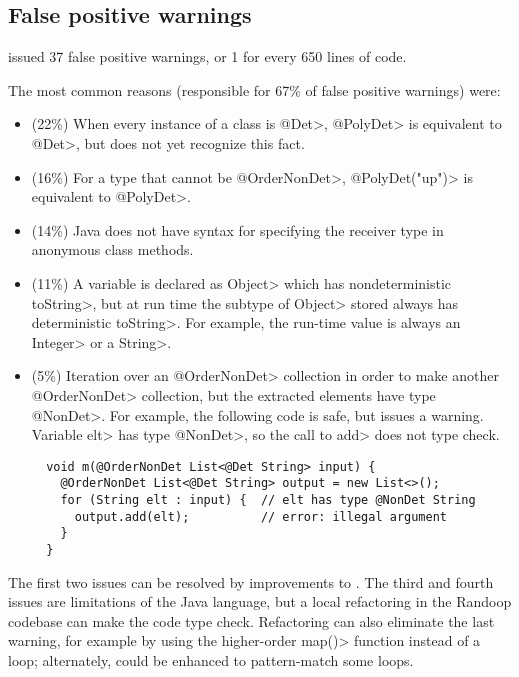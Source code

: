 \subsection{False positive warnings}

\TheDeterminismChecker issued 37 false positive warnings, or 1 for every 650
lines of code.

The most common reasons (responsible for 67\% of false positive warnings)
were:

\begin{itemize}
\item   (22\%)
  When every instance of a class is \<@Det>, \<@PolyDet> is equivalent to
  \<@Det>, but \theDeterminismChecker does not yet recognize this fact.
\item  (16\%)
  For a type that cannot be \<@OrderNonDet>, \<@PolyDet("up")> is
  equivalent to \<@PolyDet>.
\item (14\%)
  Java does not have syntax for specifying the receiver type in anonymous class
  methods.
\item (11\%)
  A variable is declared as \<Object> which has nondeterministic \<toString>,
  but at run time the subtype of \<Object> stored always has deterministic \<toString>.  For
  example, the run-time value is always an \<Integer> or a \<String>.
\item (5\%)
  Iteration over an \<@OrderNonDet> collection in order to make another
  \<@OrderNonDet> collection, but the extracted elements have type
  \<@NonDet>.  For example, the following code is safe, but
  \theDeterminismChecker issues a warning.  Variable \<elt> has type
  \<@NonDet>, so the call to \<add> does not type check.
\begin{Verbatim}
  void m(@OrderNonDet List<@Det String> input) {
    @OrderNonDet List<@Det String> output = new List<>();
    for (String elt : input) {  // elt has type @NonDet String
      output.add(elt);          // error: illegal argument
    }
  }
\end{Verbatim}
  
\end{itemize}

The first two issues can be resolved by improvements to
\theDeterminismCheckerImplementation.
The third and fourth issues are limitations of the Java language, but a
local refactoring in the Randoop codebase can make the code type check.
Refactoring can also eliminate the last warning, for example by using the
higher-order \<map()> function instead of a loop; alternately,
\theDeterminismChecker could be enhanced to pattern-match some loops.


